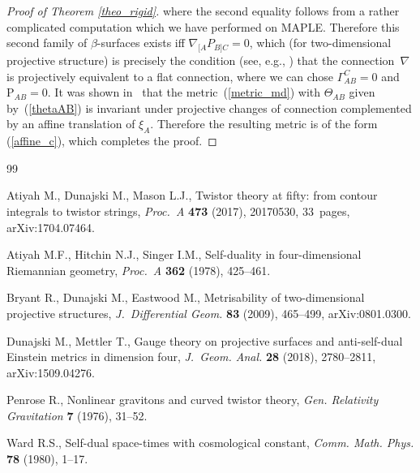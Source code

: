\documentclass[10pt,a4paper]{article}
\numberwithin{equation}{section}
\newcommand{\Rho}{\mathrm{P}}
\begin{document}
\begin{proof}[Proof of Theorem \ref{theo_rigid}]
where the second equality follows from a rather complicated computation which
we have performed on MAPLE. Therefore this second family of $\beta$-surfaces
exists iff $\nabla_{[A}P_{B]C}=0$, which (for two-dimensional projective structure) is precisely the condition (see, e.g., \cite{BDE}) that the
connection~$\nabla$ is projectively
equivalent to a flat connection, where we can chose
 $\Gamma_{AB}^C=0$ and $\Rho_{AB}=0$. It was shown in~\cite{DM} that
the metric~(\ref{metric_md}) with $\Theta_{AB}$ given by~(\ref{thetaAB})
is invariant under projective changes of connection complemented by an affine
translation of $\xi_A$. Therefore the resulting metric is of the form
(\ref{affine_c}), which completes the proof.
\end{proof}

\begin{thebibliography}{99}

Atiyah M., Dunajski M., Mason L.J., Twistor theory at fifty: from contour
 integrals to twistor strings, \textit{Proc.~A} \textbf{473} (2017), 20170530,
 33~pages, arXiv:1704.07464.


Atiyah M.F., Hitchin N.J., Singer I.M., Self-duality in four-dimensional
 {R}iemannian geometry, \textit{Proc.~A} \textbf{362} (1978), 425--461.


Bryant R., Dunajski M., Eastwood M., Metrisability of two-dimensional
 projective structures, \textit{J.~Differential Geom.} \textbf{83} (2009),
 465--499, arXiv:0801.0300.


Dunajski M., Mettler T., Gauge theory on projective surfaces and anti-self-dual
 {E}instein metrics in dimension four, \textit{J.~Geom. Anal.} \textbf{28}
 (2018), 2780--2811, arXiv:1509.04276.


Penrose R., Nonlinear gravitons and curved twistor theory, \textit{Gen.
 Relativity Gravitation} \textbf{7} (1976), 31--52.


Ward R.S., Self-dual space-times with cosmological constant, \textit{Comm.
 Math. Phys.} \textbf{78} (1980), 1--17.

\end{thebibliography}
\end{document}
